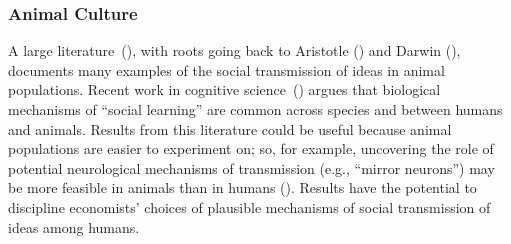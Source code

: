 


\subsubsection{Animal Culture}

A large literature~(\cite{whiten2021burgeoning}), with roots going back to Aristotle (\cite{laland2009animal}) and Darwin (\cite{heyes1996social}), documents many examples of the social transmission of ideas in animal populations.  Recent work in cognitive science~(\cite{kendal2018social}) argues that biological mechanisms of ``social learning'' are common across species and between humans and animals.  Results from this literature could be useful because animal populations are easier to experiment on; so, for example, uncovering the role of potential neurological mechanisms of transmission (e.g., ``mirror neurons'') may be more feasible in animals than in humans (\cite{carcea2019biological}).  Results have the potential to discipline economists' choices of plausible mechanisms of social transmission of ideas among humans.
